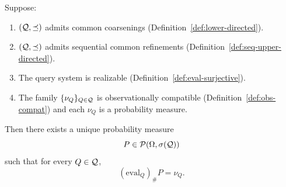 \begin{theorem}
\label{thm:obs-extension}
Suppose:
\begin{enumerate}
\item $(\mathcal{Q},\preceq)$ admits common coarsenings
      (Definition~\ref{def:lower-directed}).
\item $(\mathcal{Q},\preceq)$ admits sequential common refinements
      (Definition~\ref{def:seq-upper-directed}).
\item The query system is realizable
      (Definition~\ref{def:eval-surjective}).
\item The family $\{\nu_Q\}_{Q\in\mathcal{Q}}$ is observationally compatible
      (Definition~\ref{def:obs-compat}) and each $\nu_Q$ is a
      probability measure.
\end{enumerate}
Then there exists a unique probability measure
\[
P \in \mathcal P(\Omega,\sigma(\mathcal{Q}))
\]
such that for every $Q\in\mathcal{Q}$,
\[
(\mathrm{eval}_Q)_\# P = \nu_Q.
\]
\end{theorem}

